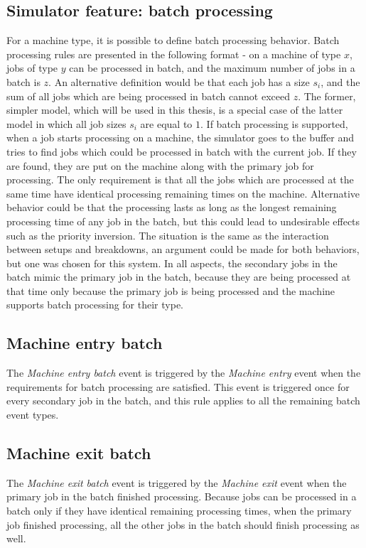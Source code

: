 \subsection{Simulator feature: batch processing}
For a machine type, it is possible to define batch processing behavior. Batch processing rules are presented in the following format - on a machine of type $x$, jobs of type $y$ can be processed in batch, and the maximum number of jobs in a batch is $z$. An alternative definition would be that each job has a size $s_i$, and the sum of all jobs which are being processed in batch cannot exceed $z$. The former, simpler model, which will be used in this thesis, is a special case of the latter model in which all job sizes $s_i$ are equal to $1$. If batch processing is supported, when a job starts processing on a machine, the simulator goes to the buffer and tries to find jobs which could be processed in batch with the current job. If they are found, they are put on the machine along with the primary job for processing. The only requirement is that all the jobs which are processed at the same time have identical processing remaining times on the machine. Alternative behavior could be that the processing lasts as long as the longest remaining processing time of any job in the batch, but this could lead to undesirable effects such as the priority inversion. The situation is the same as the interaction between setups and breakdowns, an argument could be made for both behaviors, but one was chosen for this system. In all aspects, the secondary jobs in the batch mimic the primary job in the batch, because they are being processed at that time only because the primary job is being processed and the machine supports batch processing for their type.

\subsection{Machine entry batch}
The \textit{Machine entry batch} event is triggered by the \textit{Machine entry} event when the requirements for batch processing are satisfied. This event is triggered once for every secondary job in the batch, and this rule applies to all the remaining batch event types.

\subsection{Machine exit batch}
The \textit{Machine exit batch} event is triggered by the \textit{Machine exit} event when the primary job in the batch finished processing. Because jobs can be processed in a batch only if they have identical remaining processing times, when the primary job finished processing, all the other jobs in the batch should finish processing as well.

